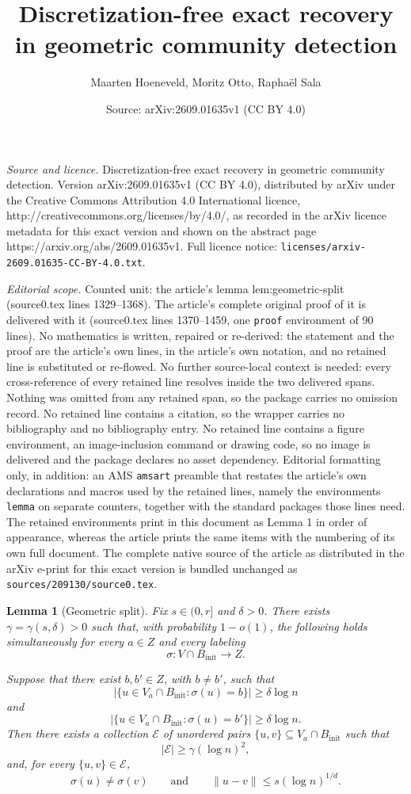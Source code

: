 \documentclass[10pt,a4paper]{amsart}
\title{Discretization-free exact recovery in geometric community detection}
\author{Maarten Hoeneveld, Moritz Otto, Rapha\"el Sala}
\date{Source: arXiv:2609.01635v1 (CC BY 4.0)}
\newtheorem{lemma}{Lemma}
\begin{document}
\maketitle

\noindent\emph{Source and licence.} Discretization-free exact recovery in geometric community detection. Version arXiv:2609.01635v1 (CC BY 4.0), distributed by arXiv under the Creative Commons Attribution 4.0 International licence, http://creativecommons.org/licenses/by/4.0/, as recorded in the arXiv licence metadata for this exact version and shown on the abstract page https://arxiv.org/abs/2609.01635v1. Full licence notice: \texttt{licenses/arxiv-2609.01635-CC-BY-4.0.txt}.\par\smallskip

\noindent\textit{Editorial scope.} Counted unit: the article's lemma lem:geometric-split (source0.tex lines 1329--1368). The article's complete original proof of it is delivered with it (source0.tex lines 1370--1459, one \texttt{proof} environment of 90 lines). No mathematics is written, repaired or re-derived: the statement and the proof are the article's own lines, in the article's own notation, and no retained line is substituted or re-flowed.  No further source-local context is needed: every cross-reference of every retained line resolves inside the two delivered spans.  Nothing was omitted from any retained span, so the package carries no omission record.  No retained line contains a citation, so the wrapper carries no bibliography and no bibliography entry.  No retained line contains a figure environment, an image-inclusion command or drawing code, so no image is delivered and the package declares no asset dependency.  Editorial formatting only, in addition: an AMS \texttt{amsart} preamble that restates the article's own declarations and macros used by the retained lines, namely the environments \texttt{lemma} on separate counters, together with the standard packages those lines need.  The retained environments print in this document as Lemma 1 in order of appearance, whereas the article prints the same items with the numbering of its own full document.  The complete native source of the article as distributed in the arXiv e-print for this exact version is bundled unchanged as \texttt{sources/209130/source0.tex}.
\begin{lemma}[Geometric split]
\label{lem:geometric-split}
Fix $s\in(0,r]$ and $\delta>0$. There exists
$\gamma=\gamma(s,\delta)>0$ such that, with probability $1-o(1)$,
the following holds simultaneously for every $a\in Z$ and every
labeling
\[
\sigma:V\cap B_{\mathrm{init}}\to Z.
\]

Suppose that there exist $b,b'\in Z$, with $b\neq b'$, such that
\[
\left|
\{u\in V_a\cap B_{\mathrm{init}}:\sigma(u)=b\}
\right|
\geq\delta\log n
\]
and
\[
\left|
\{u\in V_a\cap B_{\mathrm{init}}:\sigma(u)=b'\}
\right|
\geq\delta\log n.
\]
Then there exists a collection $\mathcal E$ of unordered pairs
$\{u,v\}\subseteq V_a\cap B_{\mathrm{init}}$ such that
\[
|\mathcal E|
\geq
\gamma(\log n)^2,
\]
and, for every $\{u,v\}\in\mathcal E$,
\[
\sigma(u)\neq\sigma(v)
\qquad\text{and}\qquad
\|u-v\|
\leq
s(\log n)^{1/d}.
\]
\end{lemma}
\end{document}
